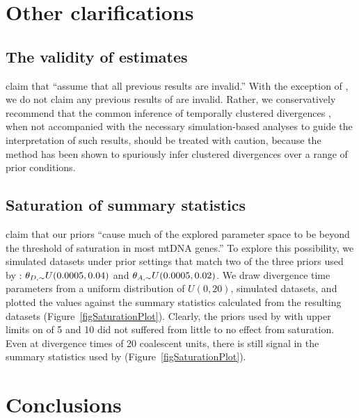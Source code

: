 \documentclass[letterpaper,12pt]{article}
\begin{document}
\begin{linenumbers}
\section*{Other clarifications}

\subsection*{The validity of \msb estimates}
\citet{Hickerson2013} claim that \citet{Oaks2012} ``assume that all previous
\msb results are invalid.''
With the exception of \citet{Hickerson2013}, we do not claim any previous
results of \msb are invalid.
Rather, we conservatively recommend that the common inference of temporally
clustered divergences
\citep{Barber2010, Bell2012, Carnaval2009, Chan2011, Daza2010, Hickerson2006,
    Huang2011, Lawson2010, Leache2007, Plouviez2009, Stone2012, Voje2009},
when not accompanied with the necessary simulation-based analyses to guide the
interpretation of such results, should be treated with caution, because the
method has been shown to spuriously infer clustered divergences over a range of
prior conditions.

\subsection*{Saturation of summary statistics}
\citet{Hickerson2013} claim that our priors ``cause much of the explored
parameter space to be beyond the threshold of saturation in most mtDNA genes.''
To explore this possibility, we simulated datasets under prior settings that
match two of the three priors used by \citet{Oaks2012}: $\meanDescendantTheta
\sim U(0.0005, 0.04)$ and $\ancestralTheta \sim U(0.0005, 0.02)$.
We draw divergence time parameters from a uniform distribution of $U(0, 20)$,
simulated datasets, and plotted the \divt{} values against the summary
statistics calculated from the resulting datasets
(Figure~\ref{figSaturationPlot}).
Clearly, the priors used by \citet{Oaks2012} with upper limits on \divt{} of 5
and 10 did not suffered from little to no effect from saturation.  Even at
divergence times of 20 coalescent units, there is still signal in the summary
statistics used by \msb (Figure~\ref{figSaturationPlot}).



\section*{Conclusions}




\end{linenumbers}
\end{document}
